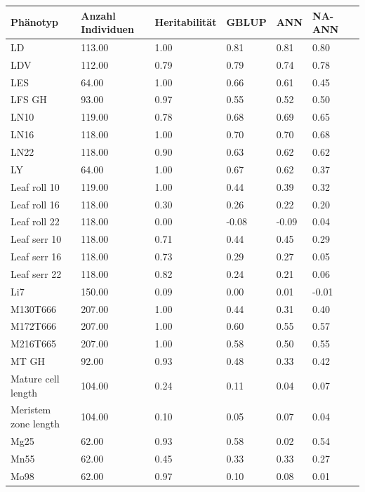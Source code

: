 \documentclass[ngerman,onecolumn,bibliography=totocnumbered]{scrreprt}
\begin{document}
\begin{table}[]
\begin{tabular}{|l|l|l|l|l|l|l|}
\hline
Phänotyp 					& Anzahl Individuen & Heritabilität & GBLUP & ANN 	 & NA-ANN \\ \hline
LD  & 113.00  & 1.00  & 0.81  & 0.81  & 0.80 \\ \hline
LDV  & 112.00  & 0.79  & 0.79  & 0.74  & 0.78 \\ \hline
LES  & 64.00  & 1.00  & 0.66  & 0.61  & 0.45 \\ \hline
LFS GH  & 93.00  & 0.97  & 0.55  & 0.52  & 0.50 \\ \hline
LN10  & 119.00  & 0.78  & 0.68  & 0.69  & 0.65 \\ \hline
LN16  & 118.00  & 1.00  & 0.70  & 0.70  & 0.68 \\ \hline
LN22  & 118.00  & 0.90  & 0.63  & 0.62  & 0.62 \\ \hline
LY   & 64.00  & 1.00  & 0.67  & 0.62  & 0.37 \\ \hline
Leaf roll 10  & 119.00  & 1.00  & 0.44  & 0.39  & 0.32 \\ \hline
Leaf roll 16  & 118.00  & 0.30  & 0.26  & 0.22  & 0.20 \\ \hline
Leaf roll 22  & 118.00  & 0.00  & -0.08  & -0.09  & 0.04 \\ \hline
Leaf serr 10  & 118.00  & 0.71  & 0.44  & 0.45  & 0.29 \\ \hline
Leaf serr 16  & 118.00  & 0.73  & 0.29  & 0.27  & 0.05 \\ \hline
Leaf serr 22  & 118.00  & 0.82  & 0.24  & 0.21  & 0.06 \\ \hline
Li7  & 150.00  & 0.09  & 0.00  & 0.01  & -0.01 \\ \hline
M130T666  & 207.00  & 1.00  & 0.44  & 0.31  & 0.40 \\ \hline
M172T666  & 207.00  & 1.00  & 0.60  & 0.55  & 0.57 \\ \hline
M216T665  & 207.00  & 1.00  & 0.58  & 0.50  & 0.55 \\ \hline
MT GH  & 92.00  & 0.93  & 0.48  & 0.33  & 0.42 \\ \hline
Mature cell length  & 104.00  & 0.24  & 0.11  & 0.04  & 0.07 \\ \hline
Meristem zone length  & 104.00  & 0.10  & 0.05  & 0.07  & 0.04 \\ \hline
Mg25  & 62.00  & 0.93  & 0.58  & 0.02  & 0.54 \\ \hline
Mn55  & 62.00  & 0.45  & 0.33  & 0.33  & 0.27 \\ \hline
Mo98  & 62.00  & 0.97  & 0.10  & 0.08  & 0.01 \\ \hline

\end{tabular}
\end{table}
\end{document}
